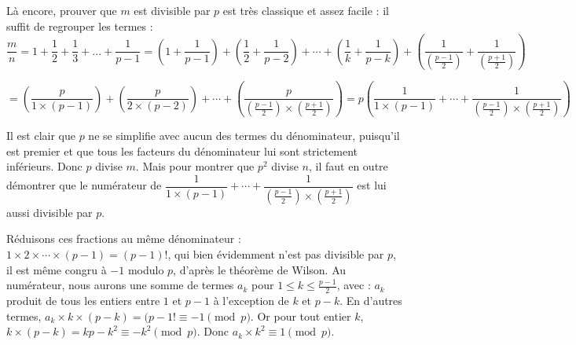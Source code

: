 \begin{sol}

\medskip

Là encore, prouver que $m$ est divisible par $p$ est très classique et assez facile : il suffit de regrouper les termes : 
$$ \dfrac{m}{n} = 1 + \dfrac12 + \dfrac13 + ... + \dfrac1{p-1} = \left( 1 + \dfrac1{p-1} \right) + \left( \dfrac12 + \dfrac1{p-2} \right) + \cdots + \left( \dfrac1{k} + \dfrac1{p-k} \right) + \left( \dfrac1{\left(\frac{p-1}{2}\right)} + \dfrac1{\left(\frac{p+1}{2}\right)} \right) $$

$$ = \left( \dfrac{p}{1 \times (p-1)} \right) + \left( \dfrac{p}{2 \times (p-2)} \right) + \cdots + \left( \dfrac{p}{\left(\frac{p-1}{2}\right) \times \left(\frac{p+1}{2}\right)} \right) = p \left( \dfrac1{1 \times (p-1)} + \cdots +  \dfrac1{\left(\frac{p-1}{2}\right) \times \left(\frac{p+1}{2}\right)} \right)$$
 
 
Il est clair que $p$ ne se simplifie avec aucun des termes du dénominateur, puisqu'il est premier et que tous les facteurs du dénominateur lui sont strictement inférieurs. Donc $p$ divise $m$. Mais pour montrer que $p^2$ divise $n$, il faut en outre démontrer que le numérateur de  $\dfrac1{1 \times (p-1)} + \cdots +  \dfrac1{\left(\frac{p-1}{2}\right) \times \left(\frac{p+1}{2}\right)}$ est lui aussi divisible par $p$. 

\medskip

Réduisons ces fractions au même dénominateur : $1 \times 2 \times \cdots \times (p-1) = (p-1)!$, qui bien évidemment n'est pas divisible par $p$, il est même congru à $-1$ modulo $p$, d'après le théorème de Wilson. Au numérateur, nous aurons une somme de termes $a_k$ pour $1 \leq k \leq \frac{p-1}{2}$, avec : $a_k$ produit de tous les entiers entre $1$ et $p-1$ à l'exception de $k$ et $p-k$. En d'autres termes, $a_k \times k \times (p-k) = (p-1! \equiv -1 \pmod{p}$. Or pour tout entier $k$, $k \times (p-k) = kp - k^2 \equiv -k^2 \pmod{p}$. Donc $a_k \times k^2 \equiv 1 \pmod{p}$. 

\smallskip


\end{sol}
